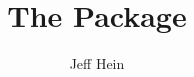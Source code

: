\documentclass[10pt,letterpaper,oneside]{memoir}
\title{The \texttt{\tdplot} Package}
\author{Jeff Hein}
\newif\ifscratch		%
\begin{document}




\ifscratch
	
\end{document}
